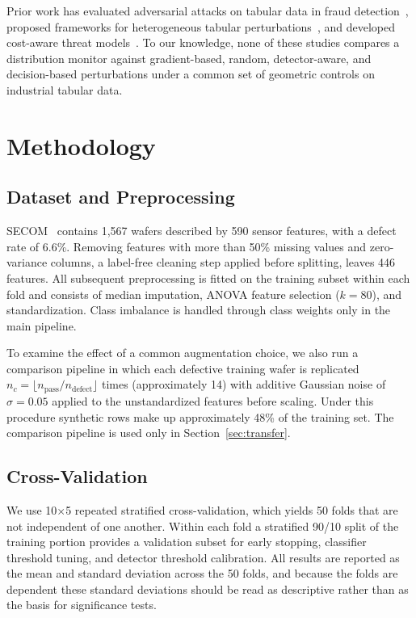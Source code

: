 \documentclass[preprint,12pt,authoryear]{elsarticle}
\begin{document}
Prior work has evaluated adversarial attacks on tabular data in fraud detection~\citep{cartella2021}, proposed frameworks for heterogeneous tabular perturbations~\citep{mathov2022}, and developed cost-aware threat models~\citep{kireev2023}. To our knowledge, none of these studies compares a distribution monitor against gradient-based, random, detector-aware, and decision-based perturbations under a common set of geometric controls on industrial tabular data.

\section{Methodology}
\label{sec:method}

\subsection{Dataset and Preprocessing}
SECOM~\citep{secom2008} contains 1,567 wafers described by 590 sensor features, with a defect rate of 6.6\%. Removing features with more than 50\% missing values and zero-variance columns, a label-free cleaning step applied before splitting, leaves 446 features. All subsequent preprocessing is fitted on the training subset within each fold and consists of median imputation, ANOVA feature selection ($k=80$), and standardization. Class imbalance is handled through class weights only in the main pipeline.

To examine the effect of a common augmentation choice, we also run a comparison pipeline in which each defective training wafer is replicated $n_c = \lfloor n_{\text{pass}} / n_{\text{defect}} \rfloor$ times (approximately 14) with additive Gaussian noise of $\sigma=0.05$ applied to the unstandardized features before scaling. Under this procedure synthetic rows make up approximately 48\% of the training set. The comparison pipeline is used only in Section~\ref{sec:transfer}.

\subsection{Cross-Validation}
We use 10$\times$5 repeated stratified cross-validation, which yields 50 folds that are not independent of one another. Within each fold a stratified 90/10 split of the training portion provides a validation subset for early stopping, classifier threshold tuning, and detector threshold calibration. All results are reported as the mean and standard deviation across the 50 folds, and because the folds are dependent these standard deviations should be read as descriptive rather than as the basis for significance tests.
\end{document}
